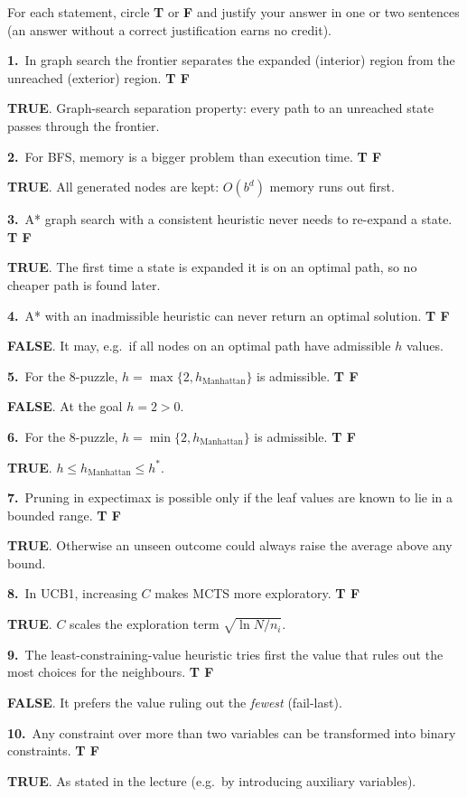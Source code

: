 \documentclass[11pt,a4paper]{article}
\newcommand{\subq}[1]{\par\smallskip\noindent\textbf{#1}\ }
\newcommand{\T}{\textbf{\textcolor{green!45!black}{TRUE}}}
\newcommand{\F}{\textbf{\textcolor{red!70!black}{FALSE}}}
\begin{document}
For each statement, circle \textbf{T} or \textbf{F} and justify your answer in one or two sentences (an answer without a correct justification earns no credit).
\subq{1.}In graph search the frontier separates the expanded (interior) region from the unreached (exterior) region. \hfill \textbf{T \quad F}
\begin{solbox}
\T. Graph-search separation property: every path to an unreached state passes through the frontier.
\end{solbox}
\subq{2.}For BFS, memory is a bigger problem than execution time. \hfill \textbf{T \quad F}
\begin{solbox}
\T. All generated nodes are kept: $O(b^d)$ memory runs out first.
\end{solbox}
\subq{3.}A* graph search with a consistent heuristic never needs to re-expand a state. \hfill \textbf{T \quad F}
\begin{solbox}
\T. The first time a state is expanded it is on an optimal path, so no cheaper path is found later.
\end{solbox}
\subq{4.}A* with an inadmissible heuristic can never return an optimal solution. \hfill \textbf{T \quad F}
\begin{solbox}
\F. It may, e.g.\ if all nodes on an optimal path have admissible $h$ values.
\end{solbox}
\subq{5.}For the 8-puzzle, $h=\max\{2,h_{\text{Manhattan}}\}$ is admissible. \hfill \textbf{T \quad F}
\begin{solbox}
\F. At the goal $h=2>0$.
\end{solbox}
\subq{6.}For the 8-puzzle, $h=\min\{2,h_{\text{Manhattan}}\}$ is admissible. \hfill \textbf{T \quad F}
\begin{solbox}
\T. $h\le h_{\text{Manhattan}}\le h^*$.
\end{solbox}
\subq{7.}Pruning in expectimax is possible only if the leaf values are known to lie in a bounded range. \hfill \textbf{T \quad F}
\begin{solbox}
\T. Otherwise an unseen outcome could always raise the average above any bound.
\end{solbox}
\subq{8.}In UCB1, increasing $C$ makes MCTS more exploratory. \hfill \textbf{T \quad F}
\begin{solbox}
\T. $C$ scales the exploration term $\sqrt{\ln N/n_i}$.
\end{solbox}
\subq{9.}The least-constraining-value heuristic tries first the value that rules out the most choices for the neighbours. \hfill \textbf{T \quad F}
\begin{solbox}
\F. It prefers the value ruling out the \emph{fewest} (fail-last).
\end{solbox}
\subq{10.}Any constraint over more than two variables can be transformed into binary constraints. \hfill \textbf{T \quad F}
\begin{solbox}
\T. As stated in the lecture (e.g.\ by introducing auxiliary variables).
\end{solbox}
\end{document}
